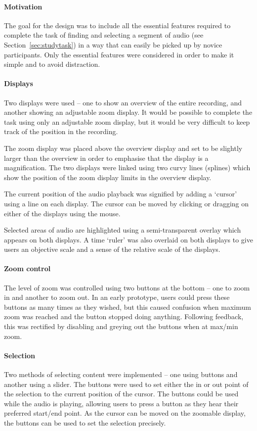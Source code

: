 \paragraph{Motivation}
The goal for the design was to include all the essential features required to
complete the task of finding and selecting a segment of audio (see
Section~\ref{sec:studytask}) in a way that can easily be picked up by novice
participants. Only the essential features were considered in order to make it
simple and to avoid distraction.

\paragraph{Displays}
Two displays were used -- one to show an overview of the entire recording, and
another showing an adjustable zoom display. It would be possible to complete
the task using only an adjustable zoom display, but it would be very difficult
to keep track of the position in the recording.

The zoom display was placed above the overview display and set to be slightly
larger than the overview in order to emphasise that the display is a
magnification. The two displays were linked using two curvy lines (splines)
which show the position of the zoom display limits in the overview display.

The current position of the audio playback was signified by adding a `cursor'
using a line on each display. The cursor can be moved by clicking or dragging
on either of the displays using the mouse.

Selected areas of audio are highlighted using a semi-transparent overlay which
appears on both displays.  A time `ruler' was also overlaid on both displays to
give users an objective scale and a sense of the relative scale of the
displays.

\paragraph{Zoom control}
The level of zoom was controlled using two buttons at the bottom -- one to zoom
in and another to zoom out. In an early prototype, users could press these
buttons as many times as they wished, but this caused confusion when maximum
zoom was reached and the button stopped doing anything. Following feedback,
this was rectified by disabling and greying out the buttons when at max/min
zoom.

\paragraph{Selection}
Two methods of selecting content were implemented -- one using buttons and
another using a slider. The buttons were used to set either the in or out point
of the selection to the current position of the cursor. The buttons could be
used while the audio is playing, allowing users to press a button as they hear
their preferred start/end point. As the cursor can be moved on the zoomable
display, the buttons can be used to set the selection precisely.

